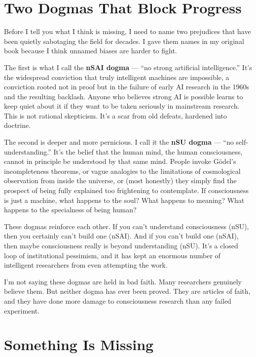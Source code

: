 \documentclass[11pt, twoside, openright]{book}
\begin{document}
\section*{Two Dogmas That Block Progress}

Before I tell you what I think is missing, I need to name two prejudices that have been quietly sabotaging the field for decades. I gave them names in my original book because I think unnamed biases are harder to fight.

The first is what I call the \textbf{nSAI dogma} --- ``no strong artificial intelligence.'' It's the widespread conviction that truly intelligent machines are impossible, a conviction rooted not in proof but in the failure of early AI research in the 1960s and the resulting backlash. Anyone who believes strong AI is possible learns to keep quiet about it if they want to be taken seriously in mainstream research. This is not rational skepticism. It's a scar from old defeats, hardened into doctrine.

The second is deeper and more pernicious. I call it the \textbf{nSU dogma} --- ``no self-understanding.'' It's the belief that the human mind, the human consciousness, cannot in principle be understood by that same mind. People invoke Gödel's incompleteness theorems, or vague analogies to the limitations of cosmological observation from inside the universe, or (most honestly) they simply find the prospect of being fully explained too frightening to contemplate. If consciousness is just a machine, what happens to the soul? What happens to meaning? What happens to the specialness of being human?

These dogmas reinforce each other. If you can't understand consciousness (nSU), then you certainly can't build one (nSAI). And if you can't build one (nSAI), then maybe consciousness really is beyond understanding (nSU). It's a closed loop of institutional pessimism, and it has kept an enormous number of intelligent researchers from even attempting the work.

I'm not saying these dogmas are held in bad faith. Many researchers genuinely believe them. But neither dogma has ever been proved. They are articles of faith, and they have done more damage to consciousness research than any failed experiment.

\section*{Something Is Missing}
\end{document}
